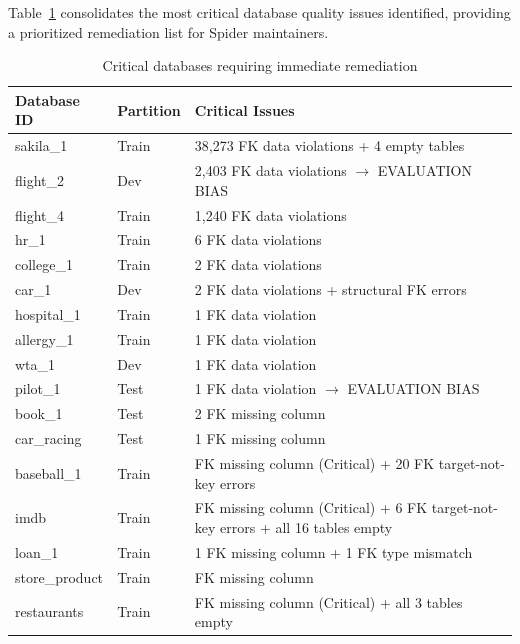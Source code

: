 \documentclass[]{einformatica}
\begin{document}
Table~\ref{tab:critical_dbs} consolidates the most critical database quality issues identified, providing a prioritized remediation list for Spider maintainers.

\begin{table}[ht]
    \caption{Critical databases requiring immediate remediation}
    \label{tab:critical_dbs}
    \centering
    \footnotesize
    \begin{tabular}{llp{}}
        \toprule
        \textbf{Database ID} & \textbf{Partition} & \textbf{Critical Issues} \\
        \midrule
        sakila\_1 & Train & 38,273 FK data violations + 4 empty tables \\
        flight\_2 & Dev & 2,403 FK data violations $\rightarrow$ EVALUATION BIAS \\
        flight\_4 & Train & 1,240 FK data violations \\
        hr\_1 & Train & 6 FK data violations \\
        college\_1 & Train & 2 FK data violations \\
        car\_1 & Dev & 2 FK data violations + structural FK errors \\
        hospital\_1 & Train & 1 FK data violation \\
        allergy\_1 & Train & 1 FK data violation \\
        wta\_1 & Dev & 1 FK data violation \\
        pilot\_1 & Test & 1 FK data violation $\rightarrow$ EVALUATION BIAS \\
        book\_1 & Test & 2 FK missing column \\
        car\_racing & Test & 1 FK missing column \\
        baseball\_1 & Train & FK missing column (Critical) + 20 FK target-not-key errors \\
        imdb & Train & FK missing column (Critical) + 6 FK target-not-key errors + all 16 tables empty \\
        loan\_1 & Train & 1 FK missing column + 1 FK type mismatch \\
        store\_product & Train & FK missing column \\
        restaurants & Train & FK missing column (Critical) + all 3 tables empty \\
        \bottomrule
    \end{tabular}
\end{table}

\FloatBarrier
\end{document}
